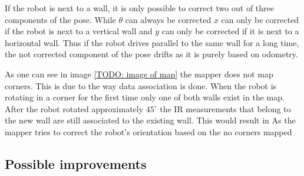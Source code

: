 If the robot is next to a wall, it is only possible to correct two out of three components of the pose. While $\theta$ can always be corrected $x$ can only be corrected if the robot is next to a vertical wall and $y$ can only be corrected if it is next to a horizontal wall. Thus if the robot drives parallel to the same wall for a long time, the not corrected component of the pose drifts as it is purely based on odometry.

As one can see in image \ref{TODO: image of map} the mapper does not map corners. This is due to the way data association is done. When the robot is rotating in a corner for the first time only one of both walls exist in the map. After the robot rotated approximately $45^{\circ}$ the IR measurements that belong to the new wall are still associated to the existing wall. This would result in As the mapper tries to correct the robot’s orientation based on the 
no corners mapped 

\subsection{Possible improvements}